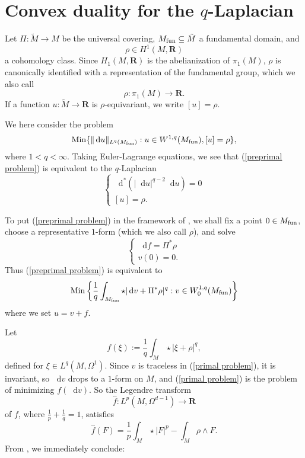 \documentclass[reqno,11pt]{amsart}
\newcommand{\RR}{\mathbf{R}}
\newcommand*\dif{\mathop{}\!\mathrm{d}}
\newcommand{\Min}{\mathrm{Min}}
\theoremstyle{definition}
\numberwithin{equation}{section}
\begin{document}
\section{Convex duality for the $q$-Laplacian}
Let $\Pi: \tilde M \to M$ be the universal covering, $M_{\rm fun} \subseteq \tilde M$ a fundamental domain, and
$$\rho \in H^1(M, \RR)$$
a cohomology class.
Since $H_1(M, \RR)$ is the abelianization of $\pi_1(M)$, $\rho$ is canonically identified with a representation of the fundamental group, which we also call
$$\rho: \pi_1(M) \to \RR.$$
If a function $u: \tilde M \to \RR$ is $\rho$-equivariant, we write $[u] = \rho$.

We here consider the problem
\begin{equation}\label{preprimal problem}
	\Min\{\|\dif u\|_{L^q(M_{\rm fun})}: u \in W^{1, q}(M_{\rm fun}), [u] = \rho\},
\end{equation}
where $1 < q < \infty$.
Taking Euler-Lagrange equations, we see that (\ref{preprimal problem}) is equivalent to the $q$-Laplacian 
$$\begin{cases}
	\dif^*(|\dif u|^{q - 2} \dif u) = 0 \\
	[u] = \rho.
\end{cases}$$

To put (\ref{preprimal problem}) in the framework of \cite[Chapter IV]{Ekeland99}, we shall fix a point $0 \in M_{\rm fun}$, choose a representative $1$-form (which we also call $\rho$), and solve 
$$\begin{cases}
\dif f = \Pi^* \rho \\
v(0) = 0.
\end{cases}$$
Thus (\ref{preprimal problem}) is equivalent to
\begin{equation}\label{primal problem}
	\Min\left\{\frac{1}{q} \int_{M_{\rm fun}} \star|\dif v + \Pi^* \rho|^q: v \in W^{1, q}_0(M_{\rm fun})\right\}
\end{equation}
where we set $u = v + f$.

Let
$$f(\xi) := \frac{1}{q} \int_M \star|\xi + \rho|^q,$$
defined for $\xi \in L^q(M, \Omega^1)$.
Since $v$ is traceless in (\ref{primal problem}), it is invariant, so $\dif v$ drops to a $1$-form on $M$, and (\ref{primal problem}) is the problem of minimizing $f(\dif v)$.
So the Legendre transform
$$\hat f: L^p(M, \Omega^{d - 1}) \to \RR$$
of $f$, where $\frac{1}{p} + \frac{1}{q} = 1$, satisfies
$$\hat f(F) = \frac{1}{p} \int_M \star |F|^p - \int_M \rho \wedge F.$$
From \cite[III(4.18) and III(4.23)]{Ekeland99}, we immediately conclude:
\end{document}
